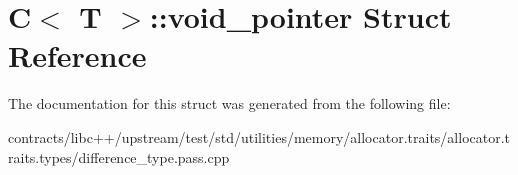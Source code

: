 \hypertarget{struct_c_1_1void__pointer}{}\section{C$<$ T $>$\+:\+:void\+\_\+pointer Struct Reference}
\label{struct_c_1_1void__pointer}


The documentation for this struct was generated from the following file\+:\begin{DoxyCompactItemize}
\item 
contracts/libc++/upstream/test/std/utilities/memory/allocator.\+traits/allocator.\+traits.\+types/difference\+\_\+type.\+pass.\+cpp\end{DoxyCompactItemize}
